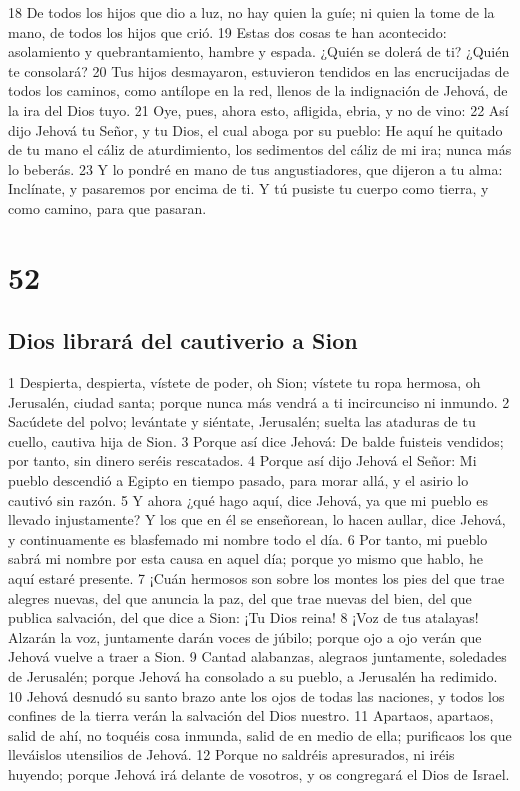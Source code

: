 18 De todos los hijos que dio a luz, no hay quien la guíe; ni quien la tome de la mano, de todos los hijos que crió.
19 Estas dos cosas te han acontecido: asolamiento y quebrantamiento, hambre y espada. ¿Quién se dolerá de ti? ¿Quién te consolará?
20 Tus hijos desmayaron, estuvieron tendidos en las encrucijadas de todos los caminos, como antílope en la red, llenos de la indignación de Jehová, de la ira del Dios tuyo.
21 Oye, pues, ahora esto, afligida, ebria, y no de vino:
22 Así dijo Jehová tu Señor, y tu Dios, el cual aboga por su pueblo: He aquí he quitado de tu mano el cáliz de aturdimiento, los sedimentos del cáliz de mi ira; nunca más lo beberás.
23 Y lo pondré en mano de tus angustiadores, que dijeron a tu alma: Inclínate, y pasaremos por encima de ti. Y tú pusiste tu cuerpo como tierra, y como camino, para que pasaran.

\chapter{52}

\section*{Dios librará del cautiverio a Sion}

1 Despierta, despierta, vístete de poder, oh Sion; vístete tu ropa hermosa, oh Jerusalén, ciudad santa; porque nunca más vendrá a ti incircunciso ni inmundo.
2 Sacúdete del polvo; levántate y siéntate, Jerusalén; suelta las ataduras de tu cuello, cautiva hija de Sion.
3 Porque así dice Jehová: De balde fuisteis vendidos; por tanto, sin dinero seréis rescatados.
4 Porque así dijo Jehová el Señor: Mi pueblo descendió a Egipto en tiempo pasado, para morar allá, y el asirio lo cautivó sin razón.
5 Y ahora ¿qué hago aquí, dice Jehová, ya que mi pueblo es llevado injustamente? Y los que en él se enseñorean, lo hacen aullar, dice Jehová, y continuamente es blasfemado mi nombre todo el día.
6 Por tanto, mi pueblo sabrá mi nombre por esta causa en aquel día; porque yo mismo que hablo, he aquí estaré presente.
7 ¡Cuán hermosos son sobre los montes los pies del que trae alegres nuevas, del que anuncia la paz, del que trae nuevas del bien, del que publica salvación, del que dice a Sion: ¡Tu Dios reina!
8 ¡Voz de tus atalayas! Alzarán la voz, juntamente darán voces de júbilo; porque ojo a ojo verán que Jehová vuelve a traer a Sion.
9 Cantad alabanzas, alegraos juntamente, soledades de Jerusalén; porque Jehová ha consolado a su pueblo, a Jerusalén ha redimido.
10 Jehová desnudó su santo brazo ante los ojos de todas las naciones, y todos los confines de la tierra verán la salvación del Dios nuestro.
11 Apartaos, apartaos, salid de ahí, no toquéis cosa inmunda, salid de en medio de ella; purificaos los que lleváislos utensilios de Jehová.
12 Porque no saldréis apresurados, ni iréis huyendo; porque Jehová irá delante de vosotros, y os congregará el Dios de Israel.


